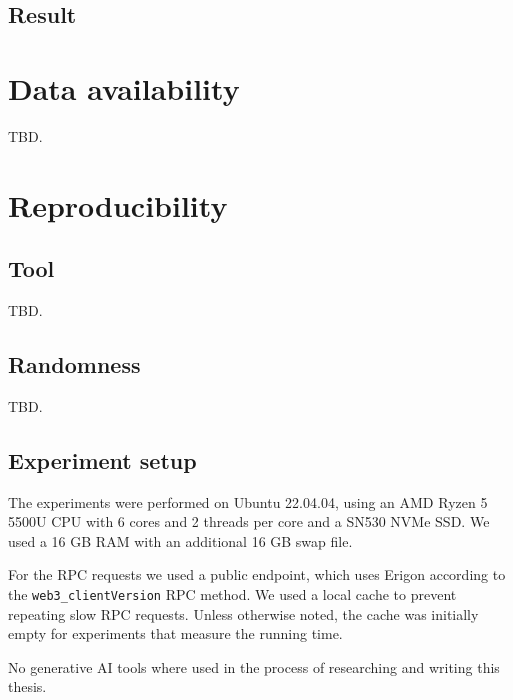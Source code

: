 \documentclass[draft,final]{vutinfth} %
\begin{document}
\section{Result}

\chapter{Data availability}

TBD.

\chapter{Reproducibility}
\label{cha:reproducibility}

\section{Tool}

TBD.

\section{Randomness}

TBD.

\section{Experiment setup}

The experiments were performed on Ubuntu 22.04.04, using an AMD Ryzen 5 5500U CPU with 6 cores and 2 threads per core and a SN530 NVMe SSD. We used a 16 GB RAM with an additional 16 GB swap file.

For the RPC requests we used a public endpoint\cite{noauthor_pokt_2024}, which uses Erigon\cite{noauthor_rpc_2024} according to the \verb|web3_clientVersion| RPC method. We used a local cache to prevent repeating slow RPC requests. \cite{fuzzland_eth_2024} Unless otherwise noted, the cache was initially empty for experiments that measure the running time.

\backmatter

\begin{aitools}
    No generative AI tools where used in the process of researching and writing this thesis.
\end{aitools}

\listoffigures %

\cleardoublepage %
\listoftables %

\listofalgorithms
{}

\printindex

\printglossaries



\end{document}
